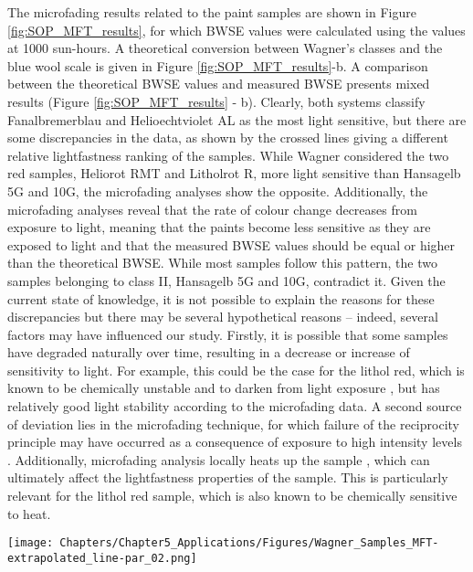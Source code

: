 The microfading results related to the paint samples are shown in Figure \ref{fig:SOP_MFT_results}, for which \gls{BWSE} values were calculated using the \dEOO values at 1000 sun-hours. A theoretical conversion between Wagner’s classes and the blue wool scale is given in Figure \ref{fig:SOP_MFT_results}-b. A comparison between the theoretical \gls{BWSE} values and measured \gls{BWSE} presents mixed results (Figure \ref{fig:SOP_MFT_results} - b). Clearly, both systems classify Fanalbremerblau and Helioechtviolet AL as the most light sensitive, but there are some discrepancies in the data, as shown by the crossed lines giving a different relative lightfastness ranking of the samples. While Wagner considered the two red samples, Heliorot RMT and Litholrot R, more light sensitive than Hansagelb 5G and 10G, the microfading analyses show the opposite. Additionally, the microfading analyses reveal that the rate of colour change decreases from exposure to light, meaning that the paints become less sensitive as they are exposed to light and that the measured \gls{BWSE} values should be equal or higher than the theoretical \gls{BWSE}. While most samples follow this pattern, the two samples belonging to class II, \ie Hansagelb 5G and 10G, contradict it. Given the current state of knowledge, it is not possible to explain the reasons for these discrepancies but there may be several hypothetical reasons – indeed, several factors may have influenced our study. Firstly, it is possible that some samples have degraded naturally over time, resulting in a decrease or increase of sensitivity to light. For example, this could be the case for the lithol red, which is known to be chemically unstable and to darken from light exposure \citep{standeven_history_2008}, but has relatively good light stability according to the microfading data. A second source of deviation lies in the microfading technique, for which failure of the reciprocity principle may have occurred as a consequence of exposure to high intensity levels \citep{del_hoyo-melendez_investigation_2011}. Additionally, microfading analysis locally heats up the sample \citep[405]{whitmore_predicting_1999}, which can ultimately affect the lightfastness properties of the sample. This is particularly relevant for the lithol red sample, which is also known to be chemically sensitive to heat.\\

\begin{figure*}[!h]
\centering
\texttt{[image: Chapters/Chapter5\_Applications/Figures/Wagner\_Samples\_MFT-extrapolated\_line-par\_02.png]}
\caption[\hspace{0.3cm}Synthetic organic pigments - MFT results]{Microfading results: (a) extrapolated \dEOO curves and (b) parallel plot.}
\label{fig:SOP_MFT_results}
\end{figure*}


